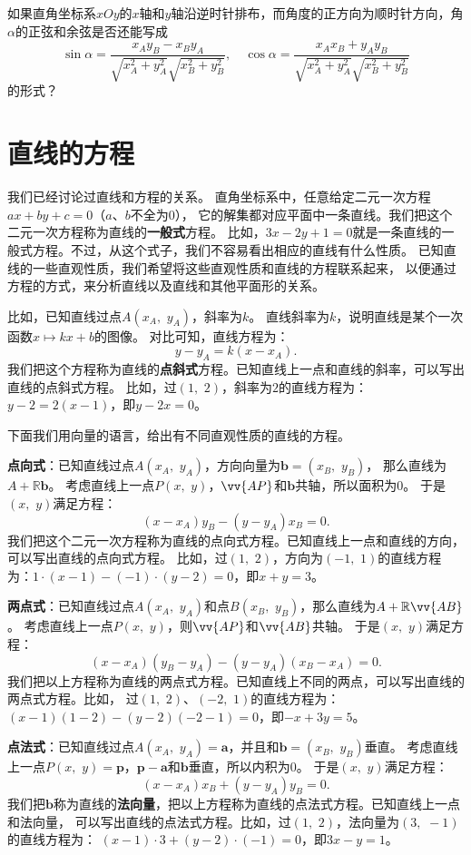 \documentclass[12pt,UTF8]{ctexbook}
\begin{document}
\begin{sk}
    如果直角坐标系$xOy$的$x$轴和$y$轴沿逆时针排布，而角度的正方向为顺时针方向，角$\alpha$的正弦和余弦是否还能写成
    $$ \sin \alpha = \frac{x_Ay_B - x_By_A}{\sqrt{x_A^2 + y_A^2}\sqrt{x_B^2 + y_B^2}}, \quad \cos \alpha = \frac{x_Ax_B + y_Ay_B}{\sqrt{x_A^2 + y_A^2} \sqrt{x_B^2 + y_B^2}}$$
    的形式？
\end{sk}

\section{直线的方程}
我们已经讨论过直线和方程的关系。
直角坐标系中，任意给定二元一次方程$ax + by + c = 0$（$a$、$b$不全为$0$），
它的解集都对应平面中一条直线。我们把这个二元一次方程称为直线的\textbf{一般式}方程。
比如，$3x - 2y + 1 = 0$就是一条直线的一般式方程。不过，从这个式子，我们不容易看出相应的直线有什么性质。
已知直线的一些直观性质，我们希望将这些直观性质和直线的方程联系起来，
以便通过方程的方式，来分析直线以及直线和其他平面形的关系。

比如，已知直线过点$A(x_A,\,\, y_A)$，斜率为$k$。
直线斜率为$k$，说明直线是某个一次函数$x \mapsto kx + b$的图像。
对比可知，直线方程为：
$$y - y_A = k(x - x_A).$$
我们把这个方程称为直线的\textbf{点斜式}方程。已知直线上一点和直线的斜率，可以写出直线的点斜式方程。
比如，过$(1,\,\,2)$，斜率为$2$的直线方程为：$y - 2 = 2(x - 1)$，即$y - 2x = 0$。

下面我们用向量的语言，给出有不同直观性质的直线的方程。

\textbf{点向式}：已知直线过点$A(x_A,\,\, y_A)$，方向向量为$\mathbf{b} = (x_B,\,\, y_B)$，
那么直线为$A + \mathbb{R}\mathbf{b}$。
考虑直线上一点$P(x,\,\, y)$，$\vv{AP}$和$\mathbf{b}$共轴，所以面积为$0$。
于是$(x,\,\,y)$满足方程：
$$(x - x_A) y_B - (y - y_A) x_B = 0.$$
我们把这个二元一次方程称为直线的点向式方程。已知直线上一点和直线的方向，可以写出直线的点向式方程。
比如，过$(1,\,\,2)$，方向为$(-1,\,\,1)$的直线方程为：$1\cdot(x - 1) - (-1)\cdot(y - 2) = 0$，即$x + y = 3$。

\textbf{两点式}：已知直线过点$A(x_A,\,\, y_A)$和点$B(x_B,\,\, y_B)$，那么直线为$A + \mathbb{R}\vv{AB}$。
考虑直线上一点$P(x,\,\, y)$，则$\vv{AP}$和$\vv{AB}$共轴。
于是$(x,\,\,y)$满足方程：
$$(x - x_A) (y_B - y_A) - (y - y_A) (x_B - x_A) = 0.$$
我们把以上方程称为直线的两点式方程。已知直线上不同的两点，可以写出直线的两点式方程。比如，
过$(1,\,\,2)$、$(-2,\,\,1)$的直线方程为：$(x - 1)(1 - 2) - (y - 2)(-2 - 1) = 0$，即$-x + 3y = 5$。

\textbf{点法式}：已知直线过点$A(x_A,\,\, y_A) = \mathbf{a}$，并且和$\mathbf{b} = (x_B,\,\, y_B)$垂直。
考虑直线上一点$P(x,\,\, y) = \mathbf{p}$，$\mathbf{p} - \mathbf{a}$和$\mathbf{b}$垂直，所以内积为$0$。
于是$(x,\,\,y)$满足方程：
$$(x - x_A) x_B + (y - y_A) y_B = 0.$$
我们把$\mathbf{b}$称为直线的\textbf{法向量}，把以上方程称为直线的点法式方程。已知直线上一点和法向量，
可以写出直线的点法式方程。比如，过$(1,\,\,2)$，法向量为$(3,\,\,-1)$的直线方程为：
$(x - 1)\cdot 3 + (y - 2)\cdot (-1) = 0$，即$3x - y= 1$。
\end{document}
